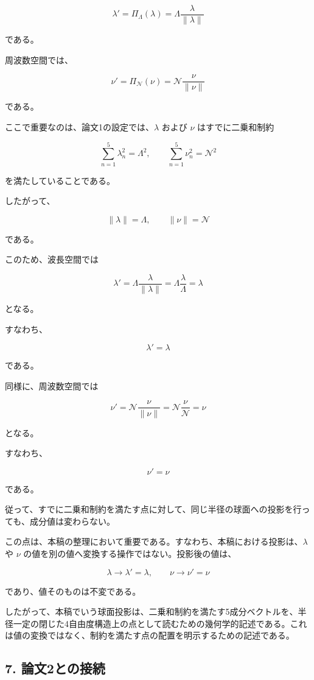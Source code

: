 \documentclass[
]{ltjsarticle}
\begin{document}
\[
\lambda'=\Pi_\Lambda(\lambda)
=
\Lambda\frac{\lambda}{\|\lambda\|}
\]

である。

周波数空間では、

\[
\nu'=\Pi_{\mathcal{N}}(\nu)
=
\mathcal{N}\frac{\nu}{\|\nu\|}
\]

である。

ここで重要なのは、論文1の設定では、\(\lambda\) および \(\nu\)
はすでに二乗和制約

\[
\sum_{n=1}^{5}\lambda_n^2=\Lambda^2,
\qquad
\sum_{n=1}^{5}\nu_n^2=\mathcal{N}^2
\]

を満たしていることである。

したがって、

\[
\|\lambda\|=\Lambda,
\qquad
\|\nu\|=\mathcal{N}
\]

である。

このため、波長空間では

\[
\lambda'
=
\Lambda\frac{\lambda}{\|\lambda\|}
=
\Lambda\frac{\lambda}{\Lambda}
=
\lambda
\]

となる。

すなわち、

\[
\boxed{\lambda'=\lambda}
\]

である。

同様に、周波数空間では

\[
\nu'
=
\mathcal{N}\frac{\nu}{\|\nu\|}
=
\mathcal{N}\frac{\nu}{\mathcal{N}}
=
\nu
\]

となる。

すなわち、

\[
\boxed{\nu'=\nu}
\]

である。

従って、すでに二乗和制約を満たす点に対して、同じ半径の球面への投影を行っても、成分値は変わらない。

この点は、本稿の整理において重要である。すなわち、本稿における投影は、\(\lambda\)
や \(\nu\) の値を別の値へ変換する操作ではない。投影後の値は、

\[
\lambda\to\lambda'=\lambda,
\qquad
\nu\to\nu'=\nu
\]

であり、値そのものは不変である。

したがって、本稿でいう球面投影は、二乗和制約を満たす5成分ベクトルを、半径一定の閉じた4自由度構造上の点として読むための幾何学的記述である。これは値の変換ではなく、制約を満たす点の配置を明示するための記述である。

\subsection{7.
論文2との接続}\label{ux8ad6ux65872ux3068ux306eux63a5ux7d9a}
\end{document}
